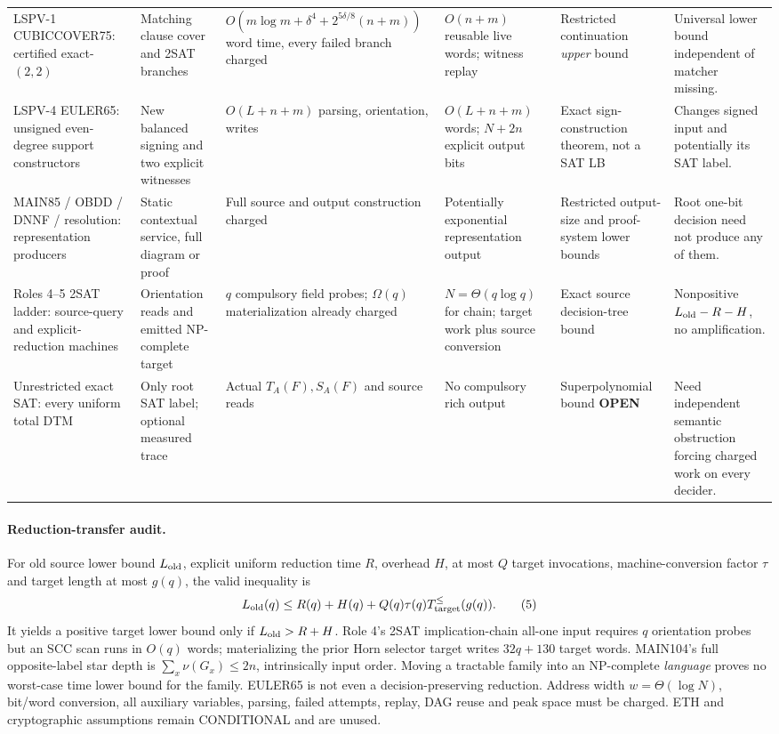 \documentclass[11pt]{article}
\newcommand{\OPEN}{\textbf{OPEN}}
\begin{document}
\begin{longtable}{@{}p{.145\linewidth}p{.155\linewidth}p{.17\linewidth}p{.155\linewidth}p{.15\linewidth}p{.175\linewidth}@{}}
LSPV-1 CUBICCOVER75: certified exact-$(2,2)$ &
Matching clause cover and 2SAT branches &
$O(m\log m+\delta^4+2^{5\delta/8}(n+m))$ word time, every failed branch charged &
$O(n+m)$ reusable live words; witness replay &
Restricted continuation \emph{upper} bound &
Universal lower bound independent of matcher missing.\\
LSPV-4 EULER65: unsigned even-degree support constructors &
New balanced signing and two explicit witnesses &
$O(L+n+m)$ parsing, orientation, writes &
$O(L+n+m)$ words; $N+2n$ explicit output bits &
Exact sign-construction theorem, not a SAT LB &
Changes signed input and potentially its SAT label.\\
MAIN85 / OBDD / DNNF / resolution: representation producers &
Static contextual service, full diagram or proof &
Full source and output construction charged &
Potentially exponential representation output &
Restricted output-size and proof-system lower bounds &
Root one-bit decision need not produce any of them.\\
Roles 4--5 2SAT ladder: source-query and explicit-reduction machines &
Orientation reads and emitted NP-complete target &
$q$ compulsory field probes; $\Omega(q)$ materialization already charged &
$N=\Theta(q\log q)$ for chain; target work plus source conversion &
Exact source decision-tree bound &
Nonpositive $L_{\rm old}-R-H$, no amplification.\\
Unrestricted exact SAT: every uniform total DTM &
Only root SAT label; optional measured trace &
Actual $T_A(F),S_A(F)$ and source reads &
No compulsory rich output &
Superpolynomial bound \OPEN &
Need independent semantic obstruction forcing charged work on every decider.\\
\bottomrule
\end{longtable}
\normalsize

\paragraph{Reduction-transfer audit.}
For old source lower bound $L_{\rm old}$, explicit uniform reduction time $R$, overhead $H$, at most $Q$ target invocations, machine-conversion factor $\tau$ and target length at most $g(q)$, the valid inequality is
\[
L_{\rm old}(q)\le R(q)+H(q)+Q(q)\tau(q)T_{\rm target}^{\le}(g(q)). \tag{5}
\]
It yields a positive target lower bound only if $L_{\rm old}>R+H$. Role 4's 2SAT implication-chain all-one input requires $q$ orientation probes but an SCC scan runs in $O(q)$ words; materializing the prior Horn selector target writes $32q+130$ target words. MAIN104's full opposite-label star depth is $\sum_x\nu(G_x)\le2n$, intrinsically input order. Moving a tractable family into an NP-complete \emph{language} proves no worst-case time lower bound for the family. EULER65 is not even a decision-preserving reduction. Address width $w=\Theta(\log N)$, bit/word conversion, all auxiliary variables, parsing, failed attempts, replay, DAG reuse and peak space must be charged. ETH and cryptographic assumptions remain CONDITIONAL and are unused.
\end{document}

